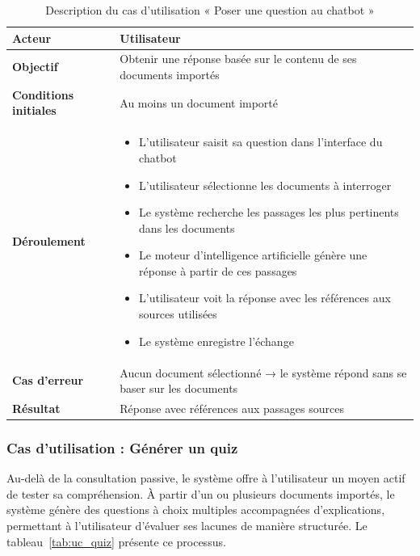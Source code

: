 \begin{table}[H]
\centering
\renewcommand{\arraystretch}{1.2}
\begin{tabular}{|p{4cm}|p{10cm}|}
\hline
\textbf{Acteur} & Utilisateur \\ \hline
\textbf{Objectif} & Obtenir une réponse basée sur le contenu de ses documents importés \\ \hline
\textbf{Conditions initiales} & Au moins un document importé \\ \hline
\textbf{Déroulement} &
\begin{itemize}
    \item L'utilisateur saisit sa question dans l'interface du chatbot
    \item L'utilisateur sélectionne les documents à interroger
    \item Le système recherche les passages les plus pertinents dans les documents
    \item Le moteur d'intelligence artificielle génère une réponse à partir de ces passages
    \item L'utilisateur voit la réponse avec les références aux sources utilisées
    \item Le système enregistre l'échange
\end{itemize} \\ \hline
\textbf{Cas d'erreur} & Aucun document sélectionné → le système répond sans se
                        baser sur les documents \\ \hline
\textbf{Résultat} & Réponse avec références aux passages sources \\ \hline
\end{tabular}
\caption{Description du cas d'utilisation « Poser une question au chatbot »}
\label{tab:uc_rag_chat}
\end{table}

\subsubsection{Cas d'utilisation : Générer un quiz}

Au-delà de la consultation passive, le système offre à l'utilisateur un moyen actif
de tester sa compréhension. À partir d'un ou plusieurs documents importés, le système
génère des questions à choix multiples accompagnées d'explications, permettant à l'utilisateur
d'évaluer ses lacunes de manière structurée. Le tableau~\ref{tab:uc_quiz} présente
ce processus.

